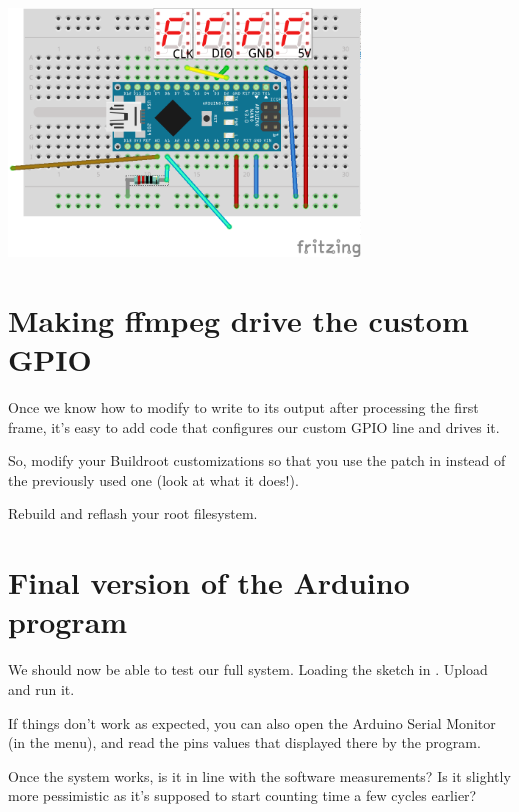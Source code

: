 \begin{center}
\includegraphics[width=0.7\textwidth]{labs/boot-time-hardware-measurement/nano-final.png}
\end{center}

\section{Making ffmpeg drive the custom GPIO}

Once we know how to modify  to write to its output after
processing the first frame, it's easy to add code that configures our
custom GPIO line and drives it.

So, modify your Buildroot customizations so that you use the patch
in
instead of the previously used one (look at what it does!).

Rebuild and reflash your root filesystem.

\section{Final version of the Arduino program}

We should now be able to test our full system.  Loading the sketch in
. Upload and run it.

If things don't work as expected, you can also open the Arduino Serial
Monitor (in the  menu), and read the pins values that
displayed there by the program.

Once the system works, is it in line with the software measurements?
Is it slightly more pessimistic as it's supposed to start counting
time a few cycles earlier?

